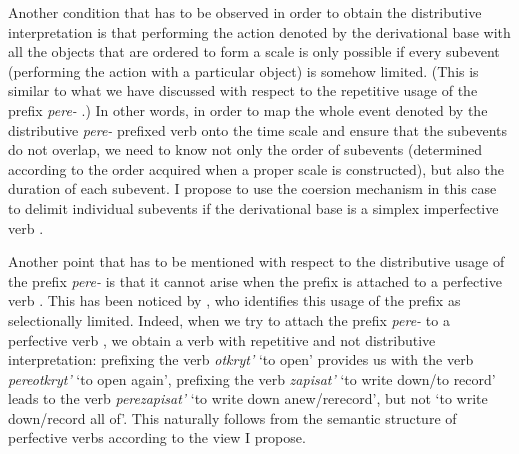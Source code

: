 Another condition that has to be observed in order to obtain the distributive  interpretation is that performing the action denoted by the derivational base with all the objects that are ordered to form a scale is only possible if every subevent (performing the action with a particular object) is somehow limited. (This is similar to what we have discussed with respect to the repetitive  usage of the prefix \textit{pere-}  .) In other words, in order to map the whole event denoted by the distributive  \textit{pere-}  prefixed verb onto the time scale and ensure that the subevents do not overlap, we need to know not only the order of subevents (determined according to the order acquired when a proper scale is constructed), but also the duration of each subevent. I propose to use the coersion mechanism in this case to delimit individual subevents if the derivational base is a simplex imperfective verb .

Another point that has to be mentioned with respect to the distributive  usage of the prefix \textit{pere-}   is that it cannot arise when the prefix is attached to a perfective verb . This has been noticed by \citet{Tatevosov:09}, who identifies this usage of the prefix as selectionally limited. Indeed, when we try to attach the prefix \textit{pere-}   to a perfective verb , we obtain a verb with repetitive  and not distributive  interpretation: prefixing the verb \textit{otkryt'} `to open' provides us with the verb \textit{pereotkryt'} `to open again', prefixing the verb \textit{zapisat'} `to write down/to record' leads to the verb \textit{perezapisat'} `to write down anew/rerecord', but not `to write down/record all of'. This naturally follows from the semantic structure of perfective verbs  according to the view I propose.


